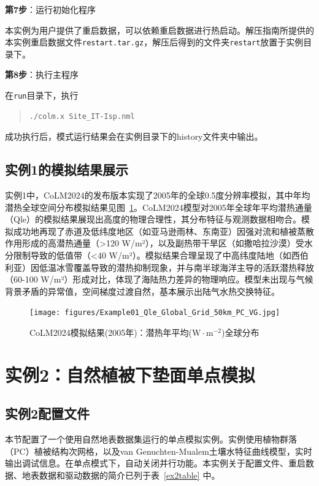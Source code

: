 \bigskip
\textbf{第7步}：运行初始化程序

本实例为用户提供了重启数据，可以依赖重启数据进行热启动。解压指南所提供的本实例重启数据文件\texttt{restart.tar.gz}，解压后得到的文件夹\texttt{restart}放置于实例目录下。

\bigskip
\textbf{第8步}：执行主程序

在\texttt{run}目录下，执行
\begin{quote}
\begin{lstlisting}
./colm.x Site_IT-Isp.nml
\end{lstlisting}
\end{quote}

成功执行后，模式运行结果会在实例目录下的history文件夹中输出。


\subsection{实例1的模拟结果展示}

实例1中，CoLM2024的发布版本实现了2005年的全球0.5度分辨率模拟，其中年均潜热全球空间分布模拟结果见图~\ref{fig:fig_example01_qle}。CoLM2024模型对2005年全球年平均潜热通量（Qle）的模拟结果展现出高度的物理合理性，其分布特征与观测数据相吻合。模拟成功地再现了赤道及低纬度地区（如亚马逊雨林、东南亚）因强对流和植被蒸散作用形成的高潜热通量（>120 W/m²），以及副热带干旱区（如撒哈拉沙漠）受水分限制导致的低值带（<40 W/m²）。模拟结果合理呈现了中高纬度陆地（如西伯利亚）因低温冰雪覆盖导致的潜热抑制现象，并与南半球海洋主导的活跃潜热释放（60-100 W/m²）形成对比，体现了海陆热力差异的物理响应。模型未出现与气候背景矛盾的异常值，空间梯度过渡自然，基本展示出陆气水热交换特征。

\begin{figure}[htpb]
    \centering
    \texttt{[image: figures/Example01\_Qle\_Global\_Grid\_50km\_PC\_VG.jpg]}
    \caption{CoLM2024模拟结果(2005年)：潜热年平均($\mathrm{W \cdot m^{-2}}$)全球分布}
    \label{fig:fig_example01_qle}
\end{figure}

\section{实例2：自然植被下垫面单点模拟}

\subsection{实例2配置文件}\label{ex2config}

本节配置了一个使用自然地表数据集运行的单点模拟实例。实例使用植物群落（PC）植被结构次网格，以及van Genuchten-Mualem土壤水特征曲线模型，实时输出调试信息。在单点模式下，自动关闭并行功能。本实例关于配置文件、重启数据、地表数据和驱动数据的简介已列于表~\ref{ex2table} 中。


